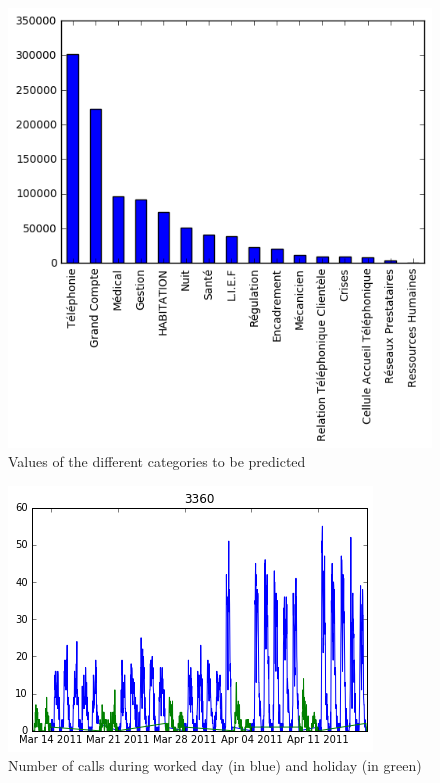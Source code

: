 \begin{appendices}

  \begin{figure}[H]
  \center
  \includegraphics[scale=0.7]{img/description_features.png}
  \caption{Values of the different categories to be predicted}
  \label{des_fig}
  \end{figure}

  \begin{figure}[H]
  \center
  \includegraphics[scale=0.7]{img/holiday.png}
  \caption{Number of calls during worked day (in blue) and holiday (in green)}
  \label{holiday}
  \end{figure}


\end{appendices}
